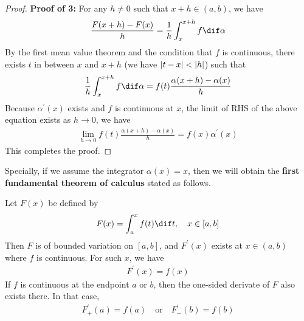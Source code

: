 \documentclass[thmcnt=section, color=blue, 12pt]{my-elegantbook}
\begin{document}
\begin{proof}
	\noindent\textbf{Proof of 3:}
	For any $h \neq 0$ such that $x+h \in (a, b)$, we have
	\begin{align*}
		\frac{F(x+h) - F(x)}{h}
		= \frac{1}{h} \int_{x}^{x+h} f \dif \alpha
	\end{align*}
	By the first mean value theorem and the condition that $f$ is continuous,
	there exists $t$ in between $x$ and $x+h$
	(we have $\left\lvert t - x \right\rvert < \left\lvert h \right\rvert$) such that
	\begin{align*}
		\frac{1}{h} \int_{x}^{x+h} f \dif \alpha
		= f(t) \frac{\alpha(x+h) - \alpha(x)}{h}
	\end{align*}
	Because $\alpha^\prime(x)$ exists and $f$ is continuous at $x$,
	the limit of RHS of the above equation exists as $h \to 0$,
	we have
	\begin{align*}
		\lim_{h \to 0} f(t) \frac{\alpha(x+h) - \alpha(x)}{h}
		= f(x) \alpha^\prime(x)
	\end{align*}
	This completes the proof.
\end{proof}

Specially, if we assume the integrator $\alpha(x) = x$,
then we will obtain the
\textbf{first fundamental theorem of calculus}
stated as follows.


\begin{theorem}
	Let $F(x)$ be defined by
	\begin{align*}
		F(x) = \int_a^x f(t) \dif t, \quad
		x \in [a, b]
	\end{align*}
	Then $F$ is of bounded variation on $[a, b]$,
	and $F^\prime(x)$ exists at $x \in (a, b)$
	where $f$ is continuous.
	For such $x$, we have
	\begin{align*}
		F^\prime(x) = f(x)
	\end{align*}
	If $f$ is continuous at the endpoint $a$ or $b$,
	then the one-sided derivate of $F$ also exists there.
	In that case,
	\begin{align*}
		F^\prime_+(a) = f(a)
		\quad \text{or} \quad
		F^\prime_{-} (b) = f(b)
	\end{align*}
\end{theorem}
\end{document}
